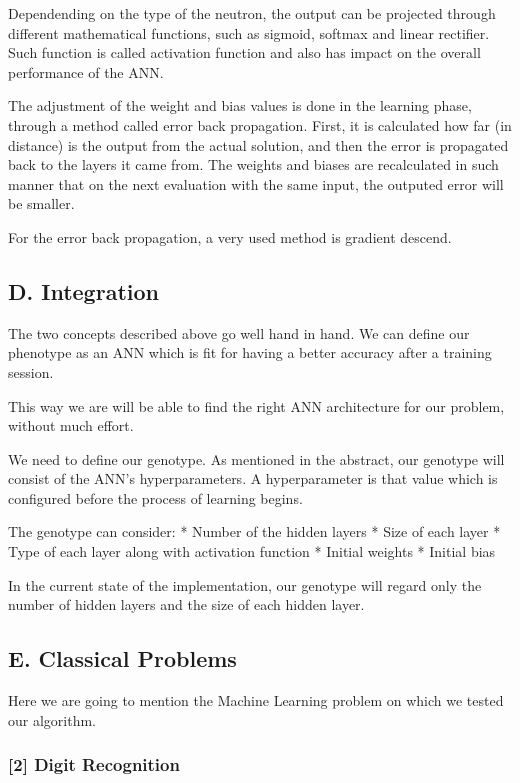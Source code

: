 \documentclass[11pt]{article}
\begin{document}
Dependending on the type of the neutron, the output can be projected
through different mathematical functions, such as sigmoid, softmax and
linear rectifier. Such function is called activation function and also
has impact on the overall performance of the ANN.

The adjustment of the weight and bias values is done in the learning
phase, through a method called error back propagation. First, it is
calculated how far (in distance) is the output from the actual solution,
and then the error is propagated back to the layers it came from. The
weights and biases are recalculated in such manner that on the next
evaluation with the same input, the outputed error will be smaller.

For the error back propagation, a very used method is gradient descend.

    \hypertarget{d.-integration}{%
\subsection{D. Integration}\label{d.-integration}}

The two concepts described above go well hand in hand. We can define our
phenotype as an ANN which is fit for having a better accuracy after a
training session.

This way we are will be able to find the right ANN architecture for our
problem, without much effort.

We need to define our genotype. As mentioned in the abstract, our
genotype will consist of the ANN's hyperparameters. A hyperparameter is
that value which is configured before the process of learning begins.

The genotype can consider: * Number of the hidden layers * Size of each
layer * Type of each layer along with activation function * Initial
weights * Initial bias

In the current state of the implementation, our genotype will regard
only the number of hidden layers and the size of each hidden layer.

    \hypertarget{e.-classical-problems}{%
\subsection{E. Classical Problems}\label{e.-classical-problems}}

Here we are going to mention the Machine Learning problem on which we
tested our algorithm.

\hypertarget{digit-recognition}{%
\subsubsection{{[}2{]} Digit Recognition}\label{digit-recognition}}
\end{document}
